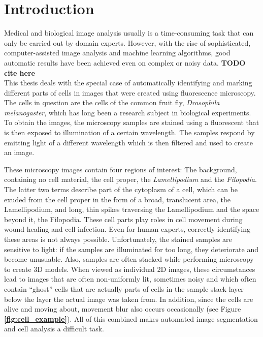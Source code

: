 \chapter{Introduction}
Medical and biological image analysis usually is a time-consuming task that can only be carried out by domain experts. However, with the rise of sophisticated, computer-assisted image analysis and machine learning algorithms, good automatic results have been achieved even on complex or noisy data. \textbf {TODO cite here}\\

\noindent This thesis deals with the special case of automatically identifying and marking different parts of cells in images that were created using fluorescence microscopy. The cells in question are the cells of the common fruit fly, \textit{Drosophila melanogaster}, which has long been a research subject in biological experiments. To obtain the images, the microscopy samples are stained using a fluorescent that is then exposed to illumination of a certain wavelength. The samples respond by emitting light of a different wavelength which is then filtered and used to create an image.

These microscopy images contain four regions of interest: The background, containing no cell material, the cell proper, the \textit{Lamellipodium} and the \textit{Filopodia}. The latter two terms describe part of the cytoplasm of a cell, which can be exuded from the cell proper in the form of a broad, translucent area, the Lamellipodium, and long, thin spikes traversing the Lamellipodium and the space beyond it, the Filopodia. These cell parts play roles in cell movement during wound healing and cell infection. Even for human experts, correctly identifying these areas is not always possible. Unfortunately, the stained samples are sensitive to light: if the samples are illuminated for too long, they deteriorate and become unusuable. Also, samples are often stacked while performing microscopy to create 3D models. When viewed as individual 2D images, these circumstances lead to images that are often non-uniformly lit, sometimes noisy and which often contain ``ghost'' cells that are actually parts of cells in the sample stack layer below the layer the actual image was taken from. In addition, since the cells are alive and moving about, movement blur also occurs occasionally (see Figure \textbf{\ref{fig:cell_example}}). All of this combined makes automated image segmentation and cell analysis a difficult task.\\

